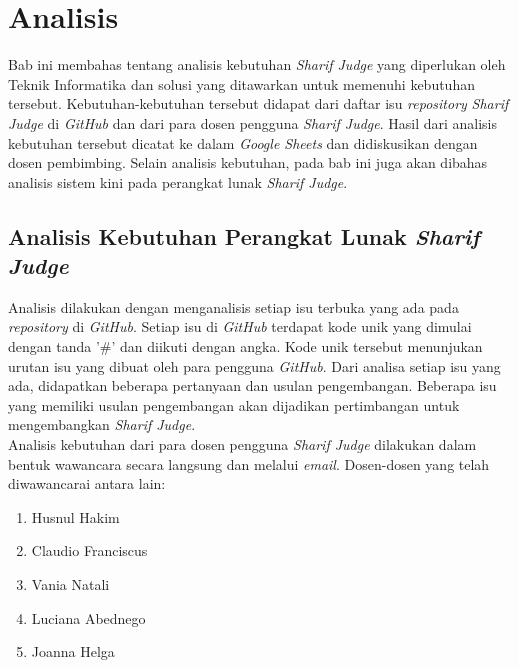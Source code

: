\chapter{Analisis}
\label{chap:analisis}

Bab ini membahas tentang analisis kebutuhan \textit{Sharif Judge} yang diperlukan oleh Teknik Informatika dan solusi yang ditawarkan untuk memenuhi kebutuhan tersebut. Kebutuhan-kebutuhan tersebut didapat dari daftar isu \textit{repository} \textit{Sharif Judge} di \textit{GitHub} dan dari para dosen pengguna \textit{Sharif Judge}. Hasil dari analisis kebutuhan tersebut dicatat ke dalam \textit{Google Sheets} dan didiskusikan dengan dosen pembimbing. Selain analisis kebutuhan, pada bab ini juga akan dibahas analisis sistem kini pada perangkat lunak \textit{Sharif Judge}.


\section{Analisis Kebutuhan Perangkat Lunak \textit{Sharif Judge}}
\label{sec:analisis}
Analisis dilakukan dengan menganalisis setiap isu terbuka yang ada pada \textit{repository} di \textit{GitHub}. Setiap isu di \textit{GitHub} terdapat kode unik yang dimulai dengan tanda '\#' dan diikuti dengan angka. Kode unik tersebut menunjukan urutan isu yang dibuat oleh para pengguna \textit{GitHub}. Dari analisa setiap isu yang ada, didapatkan beberapa pertanyaan dan usulan pengembangan. Beberapa isu yang memiliki usulan pengembangan akan dijadikan pertimbangan untuk mengembangkan \textit{Sharif Judge}. \\

Analisis kebutuhan dari para dosen pengguna \textit{Sharif Judge} dilakukan dalam bentuk wawancara secara langsung dan melalui \textit{email}. Dosen-dosen yang telah diwawancarai antara lain:
\begin{enumerate}
	\item Husnul Hakim
	\item Claudio Franciscus
	\item Vania Natali
	\item Luciana Abednego
	\item Joanna Helga
\end{enumerate}

